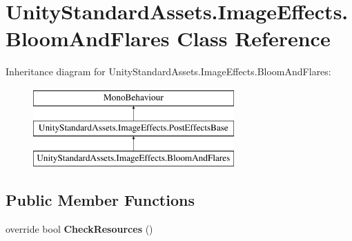 \hypertarget{class_unity_standard_assets_1_1_image_effects_1_1_bloom_and_flares}{}\section{Unity\+Standard\+Assets.\+Image\+Effects.\+Bloom\+And\+Flares Class Reference}
\label{class_unity_standard_assets_1_1_image_effects_1_1_bloom_and_flares}
Inheritance diagram for Unity\+Standard\+Assets.\+Image\+Effects.\+Bloom\+And\+Flares\+:\begin{figure}[H]
\begin{center}
\leavevmode
\includegraphics[height=3.000000cm]{class_unity_standard_assets_1_1_image_effects_1_1_bloom_and_flares}
\end{center}
\end{figure}
\subsection*{Public Member Functions}
\begin{DoxyCompactItemize}
\item 
override bool {\bfseries Check\+Resources} ()\hypertarget{class_unity_standard_assets_1_1_image_effects_1_1_bloom_and_flares_a5f5645224068a6a5273f3617bbd73c63}{}\label{class_unity_standard_assets_1_1_image_effects_1_1_bloom_and_flares_a5f5645224068a6a5273f3617bbd73c63}

\end{DoxyCompactItemize}
